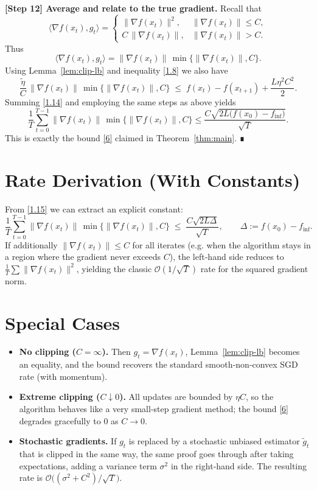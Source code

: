 \documentclass{article}
\begin{document}
\noindent\textbf{[Step 12] Average and relate to the true gradient.}  
Recall that
\[
\langle\nabla f(x_t),g_t\rangle
= \begin{cases}
\|\nabla f(x_t)\|^{2}, & \|\nabla f(x_t)\|\le C,\\[2pt]
C\,\|\nabla f(x_t)\|, & \|\nabla f(x_t)\|> C .
\end{cases}
\]
Thus
\[
\langle\nabla f(x_t),g_t\rangle
= \|\nabla f(x_t)\|\,
\min\!\bigl\{\|\nabla f(x_t)\|,C\bigr\}.
\tag{1.13}
\]
Using Lemma~\ref{lem:clip-lb} and inequality \eqref{1.8} we also have
\[
\frac{\tilde\eta}{C}\,\|\nabla f(x_t)\|\,
\min\!\bigl\{\|\nabla f(x_t)\|,C\bigr\}
\;\le\;
f(x_t)-f(x_{t+1}) + \frac{L\eta^{2}C^{2}}{2}.
\tag{1.14}
\]
Summing \eqref{1.14} and employing the same steps as above yields
\[
\frac{1}{T}\sum_{t=0}^{T-1}
\|\nabla f(x_t)\|\,
\min\!\bigl\{\|\nabla f(x_t)\|,C\bigr\}
\le
\frac{C\sqrt{2L\bigl(f(x_0)-f_{\inf}\bigr)}}{\sqrt{T}} .
\tag{1.15}
\]
This is exactly the bound \eqref{6} claimed in Theorem~\ref{thm:main}. ∎

\section*{Rate Derivation (With Constants)}
From \eqref{1.15} we can extract an explicit constant:
\[
\boxed{
\frac{1}{T}\sum_{t=0}^{T-1}
\|\nabla f(x_t)\|\,
\min\!\bigl\{\|\nabla f(x_t)\|,C\bigr\}
\;\le\;
\frac{C\sqrt{2L\Delta}}{\sqrt{T}},\qquad
\Delta:=f(x_0)-f_{\inf}.
}
\]
If additionally $\|\nabla f(x_t)\|\le C$ for all iterates (e.g. when the algorithm stays in a region where the gradient never exceeds $C$), the left‑hand side reduces to $\frac{1}{T}\sum\|\nabla f(x_t)\|^{2}$, yielding the classic $\mathcal{O}(1/\sqrt{T})$ rate for the squared gradient norm.

\section*{Special Cases}
\begin{itemize}
\item \textbf{No clipping ($C=\infty$).}  
Then $g_t=\nabla f(x_t)$, Lemma~\ref{lem:clip-lb} becomes an equality, and the bound recovers the standard smooth‑non‑convex SGD rate (with momentum).
\item \textbf{Extreme clipping ($C\downarrow 0$).}  
All updates are bounded by $\eta C$, so the algorithm behaves like a very small‑step gradient method; the bound \eqref{6} degrades gracefully to $0$ as $C\to 0$.
\item \textbf{Stochastic gradients.}  
If $g_t$ is replaced by a stochastic unbiased estimator $\tilde g_t$ that is clipped in the same way, the same proof goes through after taking expectations, adding a variance term $\sigma^{2}$ in the right‑hand side. The resulting rate is $\mathcal{O}\bigl((\sigma^{2}+C^{2})/\sqrt{T}\bigr)$.
\end{itemize}
\end{document}
